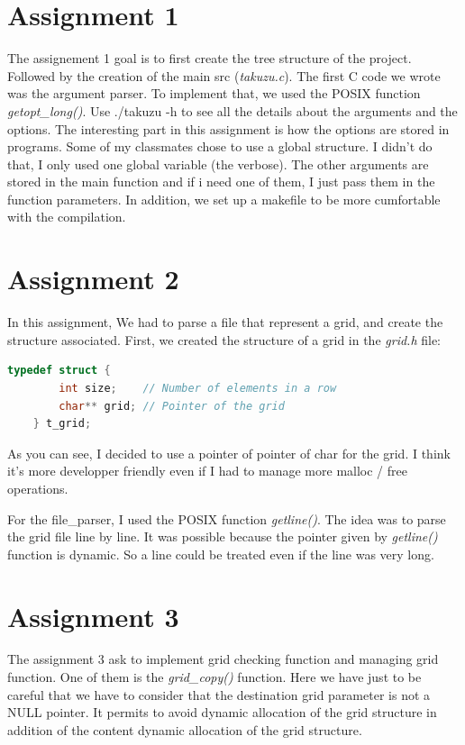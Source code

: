 \documentclass[a4paper,12pt]{article}
\begin{document}
\section{Assignment 1}

The assignement 1 goal is to first create the tree structure of the project.
Followed by the creation of the main src (\textit{takuzu.c}). 
The first C code we wrote was the argument parser. 
To implement that, we used the POSIX function \textit{getopt\_long()}. 
Use ./takuzu -h to see all the details about the arguments and the options.
The interesting part in this assignment is how the options are stored in programs.
Some of my classmates chose to use a global structure. I didn't do that, 
I only used one global variable (the verbose). The other arguments are stored in the main function and if i need
one of them, I just pass them in the function parameters.
In addition, we set up a makefile to be more cumfortable with the compilation.

\section{Assignment 2}

In this assignment, We had to parse a file that represent a grid, and create the structure associated.
First, we created the structure of a grid in the \textit{grid.h} file: 
\\
    \begin{lstlisting}[language=C]
        typedef struct {
        int size;    // Number of elements in a row
        char** grid; // Pointer of the grid
    } t_grid;
    \end{lstlisting}
    
As you can see, I decided to use a pointer of pointer of char for the grid. I think it's more developper friendly even if I had to manage more malloc / free operations.


For the file\_parser, I used the POSIX function \textit{getline()}. The idea
was to parse the grid file line by line. It was possible because the pointer given by \textit{getline()} function 
is dynamic. So a line could be treated even if the line was very long.

\section{Assignment 3}

The assignment 3 ask to implement grid checking function and managing grid function. One of them is the \textit{grid\_copy()} function. Here we have just to be careful that we have to consider
that the destination grid parameter is not a NULL pointer. It permits to avoid dynamic allocation of the grid structure in addition of the content dynamic 
allocation of the grid structure.
\end{document}
